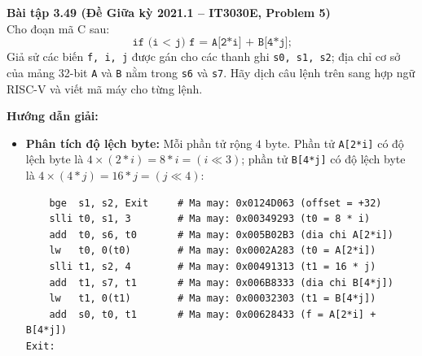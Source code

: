 \textbf{Bài tập 3.49 (Đề Giữa kỳ 2021.1 -- IT3030E, Problem 5)}\\
Cho đoạn mã C sau:
$$\texttt{if (i < j) f = A[2*i] + B[4*j];}$$
Giả sử các biến \texttt{f, i, j} được gán cho các thanh ghi \texttt{s0, s1, s2}; địa chỉ cơ sở của mảng 32-bit \texttt{A} và \texttt{B} nằm trong \texttt{s6} và \texttt{s7}. Hãy dịch câu lệnh trên sang hợp ngữ RISC-V và viết mã máy cho từng lệnh.

\textbf{Hướng dẫn giải:}
\begin{itemize}
    \item \textbf{Phân tích độ lệch byte:} Mỗi phần tử rộng $4\text{ byte}$. Phần tử \texttt{A[2*i]} có độ lệch byte là $4 \times (2*i) = 8*i = (i \ll 3)$; phần tử \texttt{B[4*j]} có độ lệch byte là $4 \times (4*j) = 16*j = (j \ll 4)$:

\noindent\begin{minipage}{\linewidth}
\begin{lstlisting}
    bge  s1, s2, Exit     # Ma may: 0x0124D063 (offset = +32)
    slli t0, s1, 3        # Ma may: 0x00349293 (t0 = 8 * i)
    add  t0, s6, t0       # Ma may: 0x005B02B3 (dia chi A[2*i])
    lw   t0, 0(t0)        # Ma may: 0x0002A283 (t0 = A[2*i])
    slli t1, s2, 4        # Ma may: 0x00491313 (t1 = 16 * j)
    add  t1, s7, t1       # Ma may: 0x006B8333 (dia chi B[4*j])
    lw   t1, 0(t1)        # Ma may: 0x00032303 (t1 = B[4*j])
    add  s0, t0, t1       # Ma may: 0x00628433 (f = A[2*i] + B[4*j])
Exit:
\end{lstlisting}
\end{minipage}
\end{itemize}

